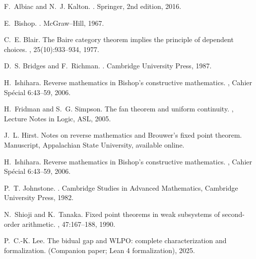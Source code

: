 \documentclass[11pt]{article}
\theoremstyle{definition}
\theoremstyle{remark}
\begin{document}

\begin{thebibliography}{10}

F.~Albiac and N.~J. Kalton.
.
\newblock Springer, 2nd edition, 2016.

E.~Bishop.
.
\newblock McGraw--Hill, 1967.

C.~E. Blair.
\newblock The {B}aire category theorem implies the principle of dependent choices.
, 25(10):933--934, 1977.

D.~S. Bridges and F.~Richman.
.
\newblock Cambridge University Press, 1987.

H.~Ishihara.
\newblock Reverse mathematics in {B}ishop's constructive mathematics.
, Cahier Sp\'ecial 6:43--59, 2006.


H.~Fridman and S.~G. Simpson.
\newblock The fan theorem and uniform continuity.
, Lecture Notes in Logic, ASL, 2005.

J.~L. Hirst.
\newblock Notes on reverse mathematics and {B}rouwer's fixed point theorem.
\newblock Manuscript, Appalachian State University, available online.

H.~Ishihara.
\newblock Reverse mathematics in {B}ishop's constructive mathematics.
, Cahier Sp\'ecial 6:43--59, 2006.

P.~T. Johnstone.
.
\newblock Cambridge Studies in Advanced Mathematics, Cambridge University Press, 1982.

N.~Shioji and K.~Tanaka.
\newblock Fixed point theorems in weak subsystems of second-order arithmetic.
, 47:167--188, 1990.

P.~C.-K. Lee.
\newblock The bidual gap and {WLPO}: complete characterization and
  formalization.
\newblock (Companion paper; Lean 4 formalization), 2025.

\end{thebibliography}
\end{document}

